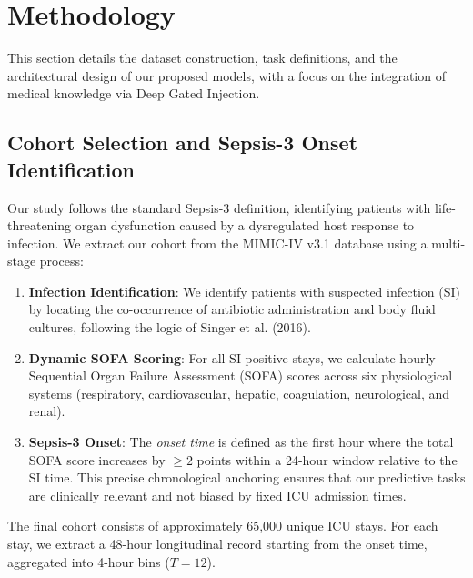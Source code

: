 \section{Methodology}
\label{sec:methodology}

This section details the dataset construction, task definitions, and the architectural design of our proposed models, with a focus on the integration of medical knowledge via Deep Gated Injection.

\subsection{Cohort Selection and Sepsis-3 Onset Identification}
\label{subsec:cohort}
Our study follows the standard Sepsis-3 definition, identifying patients with life-threatening organ dysfunction caused by a dysregulated host response to infection. We extract our cohort from the MIMIC-IV v3.1 database using a multi-stage process:

\begin{enumerate}
    \item \textbf{Infection Identification}: We identify patients with suspected infection (SI) by locating the co-occurrence of antibiotic administration and body fluid cultures, following the logic of Singer et al. (2016).
    \item \textbf{Dynamic SOFA Scoring}: For all SI-positive stays, we calculate hourly Sequential Organ Failure Assessment (SOFA) scores across six physiological systems (respiratory, cardiovascular, hepatic, coagulation, neurological, and renal).
    \item \textbf{Sepsis-3 Onset}: The \textit{onset time} is defined as the first hour where the total SOFA score increases by $\ge 2$ points within a 24-hour window relative to the SI time. This precise chronological anchoring ensures that our predictive tasks are clinically relevant and not biased by fixed ICU admission times.
\end{enumerate}

The final cohort consists of approximately 65,000 unique ICU stays. For each stay, we extract a 48-hour longitudinal record starting from the onset time, aggregated into 4-hour bins ($T=12$).

